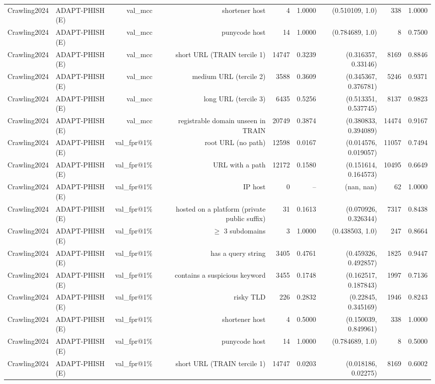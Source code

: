 \begin{table}[t]
\begin{tabular}{llrrrrrrr}
Crawling2024 & ADAPT-PHISH (E) & val\_mcc & shortener host & 4 & 1.0000 & (0.510109, 1.0) & 338 & 1.0000 \\
Crawling2024 & ADAPT-PHISH (E) & val\_mcc & punycode host & 14 & 1.0000 & (0.784689, 1.0) & 8 & 0.7500 \\
Crawling2024 & ADAPT-PHISH (E) & val\_mcc & short URL (TRAIN tercile 1) & 14747 & 0.3239 & (0.316357, 0.33146) & 8169 & 0.8846 \\
Crawling2024 & ADAPT-PHISH (E) & val\_mcc & medium URL (tercile 2) & 3588 & 0.3609 & (0.345367, 0.376781) & 5246 & 0.9371 \\
Crawling2024 & ADAPT-PHISH (E) & val\_mcc & long URL (tercile 3) & 6435 & 0.5256 & (0.513351, 0.537745) & 8137 & 0.9823 \\
Crawling2024 & ADAPT-PHISH (E) & val\_mcc & registrable domain unseen in TRAIN & 20749 & 0.3874 & (0.380833, 0.394089) & 14474 & 0.9167 \\
Crawling2024 & ADAPT-PHISH (E) & val\_fpr@1\% & root URL (no path) & 12598 & 0.0167 & (0.014576, 0.019057) & 11057 & 0.7494 \\
Crawling2024 & ADAPT-PHISH (E) & val\_fpr@1\% & URL with a path & 12172 & 0.1580 & (0.151614, 0.164573) & 10495 & 0.6649 \\
Crawling2024 & ADAPT-PHISH (E) & val\_fpr@1\% & IP host & 0 & -- & (nan, nan) & 62 & 1.0000 \\
Crawling2024 & ADAPT-PHISH (E) & val\_fpr@1\% & hosted on a platform (private public suffix) & 31 & 0.1613 & (0.070926, 0.326344) & 7317 & 0.8438 \\
Crawling2024 & ADAPT-PHISH (E) & val\_fpr@1\% & $\geq$ 3 subdomains & 3 & 1.0000 & (0.438503, 1.0) & 247 & 0.8664 \\
Crawling2024 & ADAPT-PHISH (E) & val\_fpr@1\% & has a query string & 3405 & 0.4761 & (0.459326, 0.492857) & 1825 & 0.9447 \\
Crawling2024 & ADAPT-PHISH (E) & val\_fpr@1\% & contains a suspicious keyword & 3455 & 0.1748 & (0.162517, 0.187843) & 1997 & 0.7136 \\
Crawling2024 & ADAPT-PHISH (E) & val\_fpr@1\% & risky TLD & 226 & 0.2832 & (0.22845, 0.345169) & 1946 & 0.8243 \\
Crawling2024 & ADAPT-PHISH (E) & val\_fpr@1\% & shortener host & 4 & 0.5000 & (0.150039, 0.849961) & 338 & 1.0000 \\
Crawling2024 & ADAPT-PHISH (E) & val\_fpr@1\% & punycode host & 14 & 1.0000 & (0.784689, 1.0) & 8 & 0.5000 \\
Crawling2024 & ADAPT-PHISH (E) & val\_fpr@1\% & short URL (TRAIN tercile 1) & 14747 & 0.0203 & (0.018186, 0.02275) & 8169 & 0.6002 \\

\end{tabular}
\end{table}
